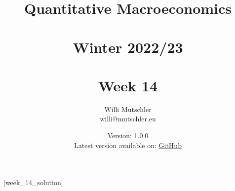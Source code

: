 
\newif\ifDisplaySolutions%


\title{Quantitative Macroeconomics\\~\\Winter 2022/23\\~\\Week 14}
\author{Willi Mutschler\\willi@mutschler.eu}
\date{Version: 1.0.0\\Latest version available on: \href{https://github.com/wmutschl/Quantitative-Macroeconomics/releases/latest/download/week_14.pdf}{GitHub}}
\maketitle\thispagestyle{empty}

\newpage
{}[week_14_solution]
\tableofcontents\thispagestyle{empty}\newpage

\setcounter{page}{1}
\newpage
\newpage
\newpage
\printbibliography

\ifDisplaySolutions
\newpage
\appendix

\section{Solutions}

\fi
